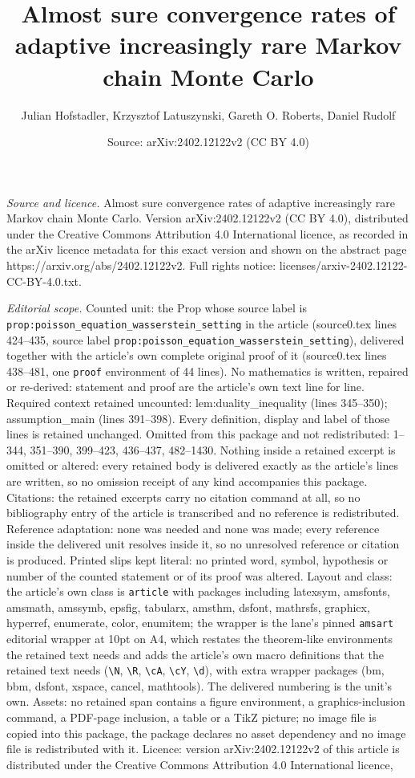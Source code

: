 \documentclass[10pt,a4paper]{amsart}
\title[Almost sure convergence rates of adaptive increasingly rare ]{Almost sure convergence rates of adaptive increasingly rare Markov chain Monte Carlo}
\author{Julian Hofstadler, Krzysztof Latuszynski, Gareth O. Roberts, Daniel Rudolf}
\date{Source: arXiv:2402.12122v2 (CC BY 4.0)}
\begin{document}
\maketitle

\noindent\emph{Source and licence.} Almost sure convergence rates of adaptive increasingly rare Markov chain Monte Carlo. Version arXiv:2402.12122v2 (CC BY 4.0), distributed under the Creative Commons Attribution 4.0 International licence, as recorded in the arXiv licence metadata for this exact version and shown on the abstract page https://arxiv.org/abs/2402.12122v2. Full rights notice: licenses/arxiv-2402.12122-CC-BY-4.0.txt.\par\smallskip

\noindent\textit{Editorial scope.} Counted unit: the Prop whose source label is \texttt{prop:poisson\_equation\_wasserstein\_setting} in the article (source0.tex lines 424--435, source label \texttt{prop:poisson\_equation\_wasserstein\_setting}), delivered together with the article's own complete original proof of it (source0.tex lines 438--481, one \texttt{proof} environment of 44 lines). No mathematics is written, repaired or re-derived: statement and proof are the article's own text line for line. Required context retained uncounted: lem:duality\_inequality (lines 345--350); assumption\_main (lines 391--398). Every definition, display and label of those lines is retained unchanged. Omitted from this package and not redistributed: 1--344, 351--390, 399--423, 436--437, 482--1430. Nothing inside a retained excerpt is omitted or altered: every retained body is delivered exactly as the article's lines are written, so no omission receipt of any kind accompanies this package. Citations: the retained excerpts carry no citation command at all, so no bibliography entry of the article is transcribed and no reference is redistributed. Reference adaptation: none was needed and none was made; every reference inside the delivered unit resolves inside it, so no unresolved reference or citation is produced. Printed slips kept literal: no printed word, symbol, hypothesis or number of the counted statement or of its proof was altered. Layout and class: the article's own class is \texttt{article} with packages including latexsym, amsfonts, amsmath, amssymb, epsfig, tabularx, amsthm, dsfont, mathrsfs, graphicx, hyperref, enumerate, color, enumitem; the wrapper is the lane's pinned \texttt{amsart} editorial wrapper at 10pt on A4, which restates the theorem-like environments the retained text needs and adds the article's own macro definitions that the retained text needs (\texttt{\textbackslash N}, \texttt{\textbackslash R}, \texttt{\textbackslash cA}, \texttt{\textbackslash cY}, \texttt{\textbackslash d}), with extra wrapper packages (bm, bbm, dsfont, xspace, cancel, mathtools). The delivered numbering is the unit's own. Assets: no retained span contains a figure environment, a graphics-inclusion command, a PDF-page inclusion, a table or a TikZ picture; no image file is copied into this package, the package declares no asset dependency and no image file is redistributed with it. Licence: version arXiv:2402.12122v2 of this article is distributed under the Creative Commons Attribution 4.0 International licence, 
\end{document}
